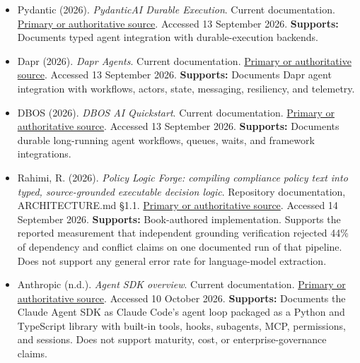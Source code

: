 \begin{itemize}
\item {}\textbf{} Pydantic (2026). \emph{PydanticAI Durable Execution}. Current documentation. \href{\detokenize{https://pydantic.dev/docs/ai/capabilities/durable_execution/overview}}{Primary or authoritative source}. Accessed 13 September 2026. \textbf{Supports:} Documents typed agent integration with durable-execution backends.

\item {}\textbf{} Dapr (2026). \emph{Dapr Agents}. Current documentation. \href{\detokenize{https://docs.dapr.io/developing-ai/dapr-agents}}{Primary or authoritative source}. Accessed 13 September 2026. \textbf{Supports:} Documents Dapr agent integration with workflows, actors, state, messaging, resiliency, and telemetry.

\item {}\textbf{} DBOS (2026). \emph{DBOS AI Quickstart}. Current documentation. \href{\detokenize{https://docs.dbos.dev/ai/ai-quickstart}}{Primary or authoritative source}. Accessed 13 September 2026. \textbf{Supports:} Documents durable long-running agent workflows, queues, waits, and framework integrations.

\item {}\textbf{} Rahimi, R. (2026). \emph{Policy Logic Forge: compiling compliance policy text into typed, source-grounded executable decision logic}. Repository documentation, ARCHITECTURE.md §1.1. \href{\detokenize{https://github.com/rrahimi-uci/policy-logic-forge}}{Primary or authoritative source}. Accessed 14 September 2026. \textbf{Supports:} Book-authored implementation. Supports the reported measurement that independent grounding verification rejected 44\% of dependency and conflict claims on one documented run of that pipeline. Does not support any general error rate for language-model extraction.

\item {}\textbf{} Anthropic (n.d.). \emph{Agent SDK overview}. Current documentation. \href{\detokenize{https://code.claude.com/docs/en/agent-sdk/overview}}{Primary or authoritative source}. Accessed 10 October 2026. \textbf{Supports:} Documents the Claude Agent SDK as Claude Code's agent loop packaged as a Python and TypeScript library with built-in tools, hooks, subagents, MCP, permissions, and sessions. Does not support maturity, cost, or enterprise-governance claims.


\end{itemize}
